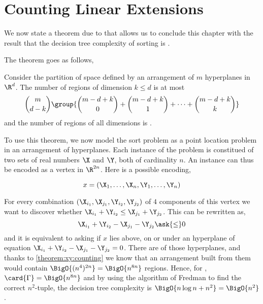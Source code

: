 \section{Counting Linear Extensions}
\label{tree:xy:counting}

We now state a theorem due to \citet*{buck:1943} that allows us to conclude
this chapter with the result that the decision tree complexity of sorting \XY
is .

The theorem goes as follows,

\begin{theorem}\label{theorem:xy:counting}
Consider the partition of space defined by an arrangement of $m$ hyperplanes in
$\R^d$.
The number of regions of dimension $k \le d$ is at most
$$
\binom{m}{d-k} \group{ \binom{m-d+k}{0} + \binom{m-d+k}{1} + \cdots + \binom{m-d+k}{k} }
$$
and the number of regions of all dimensions is .
\end{theorem}

To use this theorem, we now model the sort \XY problem as a point location problem in an
arrangement of hyperplanes. Each instance of the problem is constitued of two
sets of real numbers $\X$ and $\Y$, both of cardinality $n$. An instance can
thus be encoded as a vertex in $\R^{2n}$. Here is a possible encoding,

$$x = (\X_1, \ldots, \X_n, \Y_1, \ldots, \Y_n)$$

For every combination $(\X_{i_1}, \X_{j_1}, \Y_{i_2}, \Y_{j_2})$ of $4$
components of this vertex we want to discover whether $\X_{i_1} + \Y_{i_2} \le
\X_{j_1} + \Y_{j_2}$. This can be rewritten as,
$$\X_{i_1} + \Y_{i_2} - \X_{j_1} - \Y_{j_2} \ask{\le} 0$$
and it is equivalent to asking if $x$ lies above, on or under an
hyperplane of equation $\X_{i_1} + \Y_{i_2} - \X_{j_1} - \Y_{j_2} = 0$. There
are  of those hyperplanes, and thanks to \ref{theorem:xy:counting}
we know that an arrangement built from them would contain
$\BigO{(n^4)^{2n}} = \BigO{n^{8n}}$ regions. Hence, for \XY, $\card{\Gamma} =
\BigO{n^{8n}}$ and by using the algorithm of Fredman to find the correct
$n^2$-tuple, the decision tree complexity is
$\BigO{n \log n + n^2} = \BigO{n^2}$.


